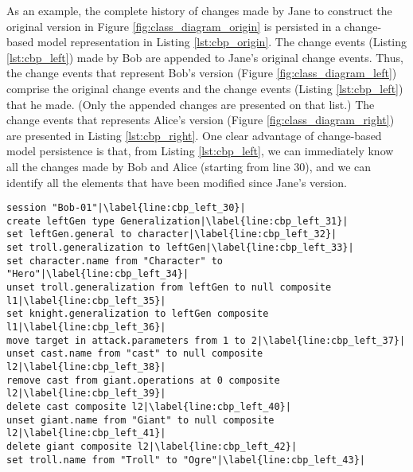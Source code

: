 As an example, the complete history of changes made by Jane to construct the original version in Figure \ref{fig:class_diagram_origin} is persisted in a change-based model representation in Listing \ref{lst:cbp_origin}. The change events (Listing \ref{lst:cbp_left}) made by Bob are appended to Jane’s original change events. Thus, the change events that represent Bob’s version (Figure \ref{fig:class_diagram_left}) comprise the original change events and the change events (Listing \ref{lst:cbp_left}) that he made. (Only the appended changes are presented on that list.) The change events that represents Alice’s version (Figure \ref{fig:class_diagram_right}) are presented in Listing \ref{lst:cbp_right}. One clear advantage of change-based model persistence is that, from Listing \ref{lst:cbp_left}, we can immediately know all the changes made by Bob and Alice (starting from line 30), and we can identify all the elements that have been modified since Jane’s version.

\vspace{-20pt}
\begin{lstlisting}[firstnumber=30,style=eol,escapechar=|,caption={The appended events made by Bob to produce Figure \ref{fig:class_diagram_left}.},label=lst:cbp_left]
session "Bob-01"|\label{line:cbp_left_30}|
create leftGen type Generalization|\label{line:cbp_left_31}|
set leftGen.general to character|\label{line:cbp_left_32}|
set troll.generalization to leftGen|\label{line:cbp_left_33}|
set character.name from "Character" to "Hero"|\label{line:cbp_left_34}|
unset troll.generalization from leftGen to null composite l1|\label{line:cbp_left_35}|
set knight.generalization to leftGen composite l1|\label{line:cbp_left_36}|
move target in attack.parameters from 1 to 2|\label{line:cbp_left_37}|
unset cast.name from "cast" to null composite l2|\label{line:cbp_left_38}|
remove cast from giant.operations at 0 composite l2|\label{line:cbp_left_39}|
delete cast composite l2|\label{line:cbp_left_40}|
unset giant.name from "Giant" to null composite l2|\label{line:cbp_left_41}|
delete giant composite l2|\label{line:cbp_left_42}|
set troll.name from "Troll" to "Ogre"|\label{line:cbp_left_43}|
\end{lstlisting}

